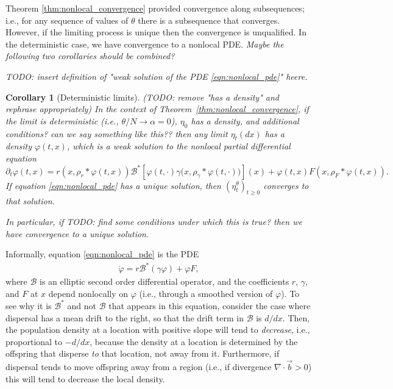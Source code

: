 \documentclass[12pt]{article}
\newtheorem{corollary}[theorem]{Corollary}
\newcommand{\grad}{\nabla}
\newcommand{\DG}{\mathcal{B}}  %
\newcommand{\meanq}{\vec b}    %
\newcommand{\kernel}{\rho}  %
\newcommand{\smooth}[1]{\kernel_{#1} \! * \!}  %
\newcommand{\comment}[1]{{\color{blue} \it #1}}
\begin{document}
Theorem \ref{thm:nonlocal_convergence} provided convergence along subsequences;
i.e., for any sequence of values of $\theta$
there is a subsequence that converges.
However, if the limiting process is unique then the convergence is unqualified.
In the deterministic case, we have convergence to a nonlocal PDE.
\comment{Maybe the following two corollaries should be combined?}

\comment{
TODO: insert definition of "weak solution of the PDE \ref{eqn:nonlocal_pde}" heere.
}

\begin{corollary}[Deterministic limits]
    \label{cor:nonlocal_pde_limits}
    \comment{(TODO: remove "has a density" and rephrase appropriately)}
    In the context of Theorem~\ref{thm:nonlocal_convergence},
    if the limit is deterministic (i.e., $\theta / N \to \alpha = 0$), $\eta_0$ has a density,
    and \comment{additional conditions? can we say something like this??}
    then any limit $\eta_t(dx)$ has a density $\varphi(t, x)$,
    which is a weak solution to the nonlocal partial differential equation
    \begin{equation} \label{eqn:nonlocal_pde}
        \partial_t \varphi(t, x)
        =
        r\left(x, \smooth{r} \varphi(t,x) \right)
        \DG^* \left[
            \varphi(t, \cdot)
            \gamma\big( x, \smooth{\gamma} \varphi(t, \cdot) \big)
        \right](x)
        +
        \varphi(t, x)
        F\left(x, \smooth{F} \varphi(t,x) \right)
        .
    \end{equation}
    If equation \eqref{eqn:nonlocal_pde} has a unique solution,
    then $(\eta^\theta_t)_{t \ge 0}$ converges to that solution.

    In particular, if
    \comment{TODO: find some conditions under which this is true?}
    then we have convergence to a unique solution.
\end{corollary}

Informally, equation \eqref{eqn:nonlocal_pde} is the PDE
\begin{align} \label{eqn:pde}
    \dot \varphi = r \DG^* \left( \gamma \varphi \right) + \varphi F ,
\end{align}
where $\DG$ is an elliptic second order differential operator,
and the coefficients $r$, $\gamma$, and $F$
at $x$ depend nonlocally on $\varphi$
(i.e., through a smoothed version of $\varphi$).
To see why it is $\DG^*$ and not $\DG$ that appears in this equation,
consider the case where dispersal has a mean drift to the right,
so that the drift term in $\DG$ is $d/dx$.
Then, the population density at a location with positive slope
will tend to \emph{decrease}, i.e., proportional to $-d/dx$,
because the density at a location is determined by the offspring that disperse \emph{to}
that location, not away from it.
Furthermore, if dispersal tends to move offspring away from a region
(i.e., if divergence $\grad \cdot \meanq > 0$)
this will tend to decrease the local density.
\end{document}

